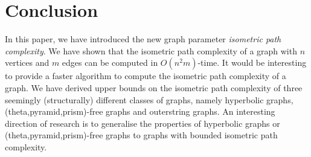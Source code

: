 \documentclass[a4paper]{article}
\newcommand{\ipac}[1]{ipacc\left(#1\right)}
\newtheorem{proposition}[theorem]{Proposition}
\begin{document}





\vspace{-5pt}


\section{Conclusion}\label{sec:conclu}

In this paper, we have introduced the new graph parameter \emph{isometric path complexity}. We have shown that the isometric path complexity of a graph with $n$ vertices and $m$ edges can be computed in $O(n^2 m)$-time. It would be interesting to provide a faster algorithm to compute the isometric path complexity of a graph. We have derived upper bounds on the isometric path complexity of three seemingly (structurally) different classes of graphs, namely hyperbolic graphs, (theta,pyramid,prism)-free graphs and outerstring graphs. An interesting direction of research is to generalise the properties of hyperbolic graphs or (theta,pyramid,prism)-free graphs to graphs with bounded isometric path complexity.
\end{document}
